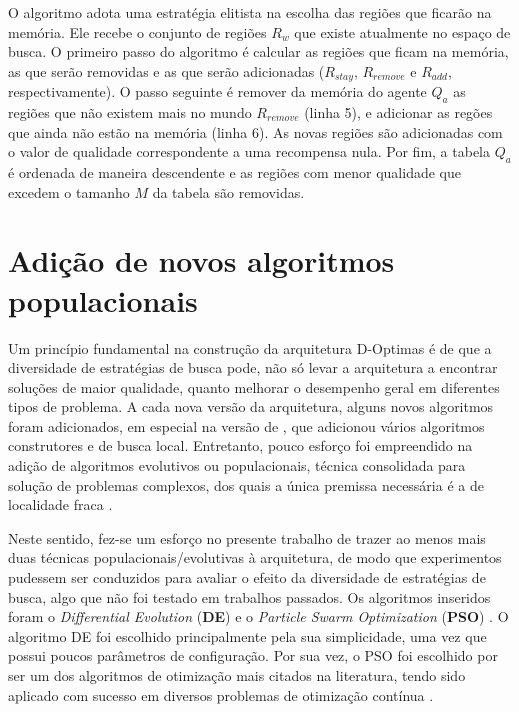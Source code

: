 O algoritmo adota uma estratégia elitista na escolha das regiões que ficarão na memória. Ele recebe o conjunto de regiões $R_w$ que existe atualmente no espaço de busca. O primeiro passo do algoritmo é calcular as regiões que ficam na memória, as que serão removidas e as que serão adicionadas ($R_{stay}$, $R_{remove}$ e $R_{add}$, respectivamente). O passo seguinte é remover da memória do agente $Q_a$ as regiões que não existem mais no mundo $R_{remove}$ (linha 5), e adicionar as regões que ainda não estão na memória (linha 6). As novas regiões são adicionadas com o valor de qualidade correspondente a uma recompensa nula. Por fim, a tabela $Q_a$ é ordenada de maneira descendente e as regiões com menor qualidade que excedem o tamanho $M$ da tabela são removidas. 

\section{Adição de novos algoritmos populacionais}
\label{sec:algoritmos}

Um princípio fundamental na construção da arquitetura D-Optimas é de que a diversidade de estratégias de busca pode, não só levar a arquitetura a encontrar soluções de maior qualidade, quanto melhorar o desempenho geral em diferentes tipos de problema. A cada nova versão da arquitetura, alguns novos algoritmos foram adicionados, em especial na versão de , que adicionou vários algoritmos construtores e de busca local. Entretanto, pouco esforço foi empreendido na adição de algoritmos evolutivos ou populacionais, técnica consolidada para solução de problemas complexos, dos quais a única premissa necessária é a de localidade fraca \cite{gaspar2012}.

Neste sentido, fez-se um esforço no presente trabalho de trazer ao menos mais duas técnicas populacionais/evolutivas à arquitetura, de modo que experimentos pudessem ser conduzidos para avaliar o efeito da diversidade de estratégias de busca, algo que não foi testado em trabalhos passados. Os algoritmos inseridos foram o \textit{Differential Evolution} (\textbf{DE}) \cite{storn1997} e o \textit{Particle Swarm Optimization} (\textbf{PSO}) \cite{eberhart1995, eberhart1998}. O algoritmo DE foi escolhido principalmente pela sua simplicidade, uma vez que possui poucos parâmetros de configuração. Por sua vez, o PSO foi escolhido por ser um dos algoritmos de otimização mais citados na literatura, tendo sido aplicado com sucesso em diversos problemas de otimização contínua \cite{bonyadi2017}. 

